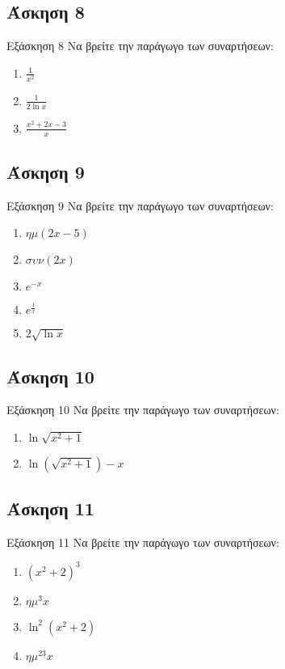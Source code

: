\documentclass[greek]{beamer}
\begin{document}
\subsection{Άσκηση 8}
\begin{frame}[label=Άσκηση8]{Εξάσκηση 8}
 Να βρείτε την παράγωγο των συναρτήσεων:
 \begin{enumerate}
  \item<1-> $\frac{1}{x^2}$
  \item<2-> $\frac{1}{2\ln x}$
  \item<3-> $\frac{x^2+2x-3}{x}$
 \end{enumerate}

\end{frame}

\subsection{Άσκηση 9}
\begin{frame}[label=Άσκηση9]{Εξάσκηση 9}
 Να βρείτε την παράγωγο των συναρτήσεων:
 \begin{enumerate}
  \item<1-> $ημ(2x-5)$
  \item<2-> $συν(2x)$
  \item<3-> $e^{-x}$
  \item<4-> $e^{\frac{1}{x}}$
  \item<5-> $2\sqrt{\ln x}$
 \end{enumerate}

\end{frame}

\subsection{Άσκηση 10}
\begin{frame}[label=Άσκηση10]{Εξάσκηση 10}
 Να βρείτε την παράγωγο των συναρτήσεων:
 \begin{enumerate}
  \item<1-> $\ln \sqrt{x^2+1}$
  \item<2-> $\ln(\sqrt{x^2+1})-x$
 \end{enumerate}

\end{frame}

\subsection{Άσκηση 11}
\begin{frame}[label=Άσκηση11]{Εξάσκηση 11}
 Να βρείτε την παράγωγο των συναρτήσεων:
 \begin{enumerate}
  \item<1-> $(x^2+2)^3$
  \item<2-> $ημ^3x$
  \item<3-> $\ln^2(x^2+2)$
  \item<4-> $ημ^23x$
 \end{enumerate}

\end{frame}
\end{document}
